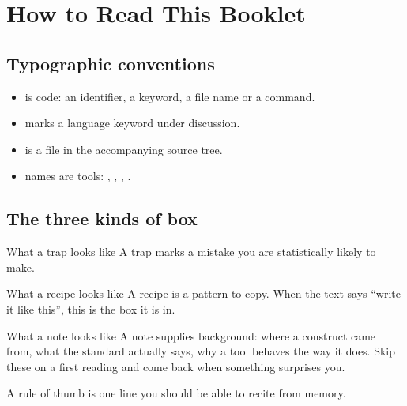 \chapter*{How to Read This Booklet}

\section*{Typographic conventions}

\begin{itemize}
  \item {} is code: an identifier, a keyword, a file name
        or a command.
  \item {} marks a language keyword under
        discussion.
  \item {} is a file in the accompanying source
        tree.
  \item {} names are tools: , ,
        , .
\end{itemize}

\section*{The three kinds of box}

\begin{gotcha}{What a trap looks like}
A trap marks a mistake you are statistically likely to make.
\end{gotcha}

\begin{tipbox}{What a recipe looks like}
A recipe is a pattern to copy. When the text says ``write it like this'',
this is the box it is in.
\end{tipbox}

\begin{notebox}{What a note looks like}
A note supplies background: where a construct came from, what the standard
actually says, why a tool behaves the way it does. Skip these on a first
reading and come back when something surprises you.
\end{notebox}

\begin{ruleofthumb}
A rule of thumb is one line you should be able to recite from memory.
\end{ruleofthumb}

